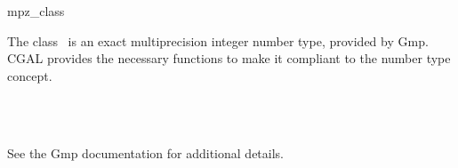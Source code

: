\ccDefGlobalScope{}

\begin{ccRefClass}{mpz_class}

\ccDefinition

The class \ccRefName\ is an exact multiprecision integer number type,
provided by {\sc Gmp}.
CGAL provides the necessary functions to make it compliant to the number type
concept.


\ccIsModel
{}\\
\\

See the {\sc Gmp} documentation for additional details.

\end{ccRefClass}
